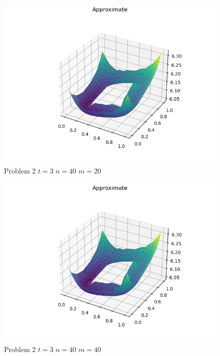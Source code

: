 \documentclass{report}
\begin{document}
\begin{figure}[h]
	\caption{Problem 2 $t = 3$ $n = 40$ $m = 20$}
	\includegraphics[width=\textwidth]{example.png}
\end{figure}
\begin{figure}[h]
	\caption{Problem 2 $t = 3$ $n = 40$ $m = 40$}
	\includegraphics[width=\textwidth]{example.png}
\end{figure}
\end{document}
